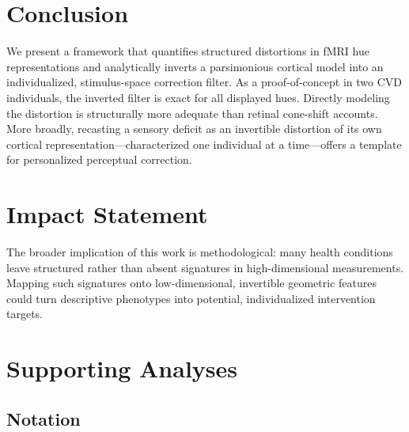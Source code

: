 \documentclass{article}
\begin{document}
\section{Conclusion}
\label{sec:conclusion}

We present a framework that quantifies structured distortions in fMRI hue representations and analytically inverts a parsimonious cortical model into an individualized, stimulus-space correction filter.
As a proof-of-concept in two CVD individuals, the inverted filter is exact for all displayed hues.
Directly modeling the distortion is structurally more adequate than retinal cone-shift accounts.
More broadly, recasting a sensory deficit as an invertible distortion of its own cortical representation---characterized one individual at a time---offers a template for personalized perceptual correction.

\section*{Impact Statement}

The broader implication of this work is methodological: many health conditions leave structured rather than absent signatures in high-dimensional measurements.
Mapping such signatures onto low-dimensional, invertible geometric features could turn descriptive phenotypes into potential, individualized intervention targets.




\newpage
\appendix
\onecolumn

\section{Supporting Analyses}
\label{app:supporting}

\subsection{Notation}
\label{app:notation}
\end{document}
